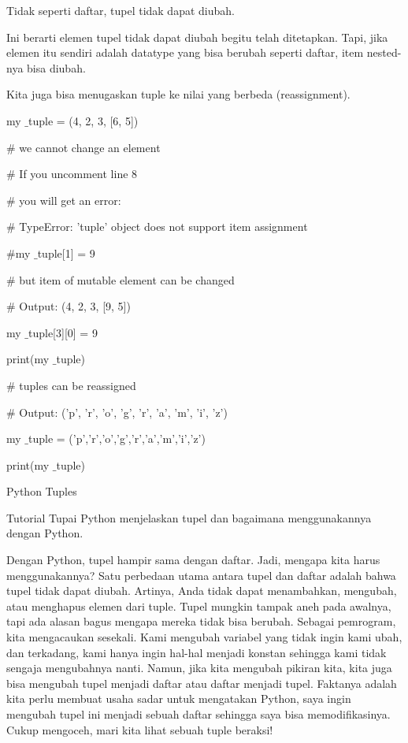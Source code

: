 Tidak seperti daftar, tupel tidak dapat diubah. \par
\vspace{12pt}
Ini berarti elemen tupel tidak dapat diubah begitu telah ditetapkan. Tapi, jika elemen itu sendiri adalah datatype yang bisa berubah seperti daftar, item nested-nya bisa diubah. \par
\vspace{12pt}
Kita juga bisa menugaskan tuple ke nilai yang berbeda (reassignment). \par
\vspace{12pt}
my $  \_  $tuple = (4, 2, 3, [6, 5]) \par
\vspace{12pt}
 $  \#  $ we cannot change an element \par
 $  \#  $ If you uncomment line 8 \par
 $  \#  $ you will get an error: \par
 $  \#  $ TypeError: 'tuple' object does not support item assignment \par
\vspace{12pt}
 $  \#  $my $  \_  $tuple[1] = 9 \par
\vspace{12pt}
 $  \#  $ but item of mutable element can be changed \par
 $  \#  $ Output: (4, 2, 3, [9, 5]) \par
my $  \_  $tuple[3][0] = 9 \par
print(my $  \_  $tuple) \par
\vspace{12pt}
 $  \#  $ tuples can be reassigned \par
 $  \#  $ Output: ('p', 'r', 'o', 'g', 'r', 'a', 'm', 'i', 'z') \par
my $  \_  $tuple = ('p','r','o','g','r','a','m','i','z') \par
print(my $  \_  $tuple) \par
\vspace{12pt}
 \hspace*{0.5in} \vspace{12pt}
Python Tuples \par
Tutorial Tupai Python menjelaskan tupel dan bagaimana menggunakannya dengan Python. \par
Dengan Python, tupel hampir sama dengan daftar. Jadi, mengapa kita harus menggunakannya? Satu perbedaan utama antara tupel dan daftar adalah bahwa tupel tidak dapat diubah. Artinya, Anda tidak dapat menambahkan, mengubah, atau menghapus elemen dari tuple. Tupel mungkin tampak aneh pada awalnya, tapi ada alasan bagus mengapa mereka tidak bisa berubah. Sebagai pemrogram, kita mengacaukan sesekali. Kami mengubah variabel yang tidak ingin kami ubah, dan terkadang, kami hanya ingin hal-hal menjadi konstan sehingga kami tidak sengaja mengubahnya nanti. Namun, jika kita mengubah pikiran kita, kita juga bisa mengubah tupel menjadi daftar atau daftar menjadi tupel. Faktanya adalah kita perlu membuat usaha sadar untuk mengatakan Python, saya ingin mengubah tupel ini menjadi sebuah daftar sehingga saya bisa memodifikasinya. Cukup mengoceh, mari kita lihat sebuah tuple beraksi! \par

